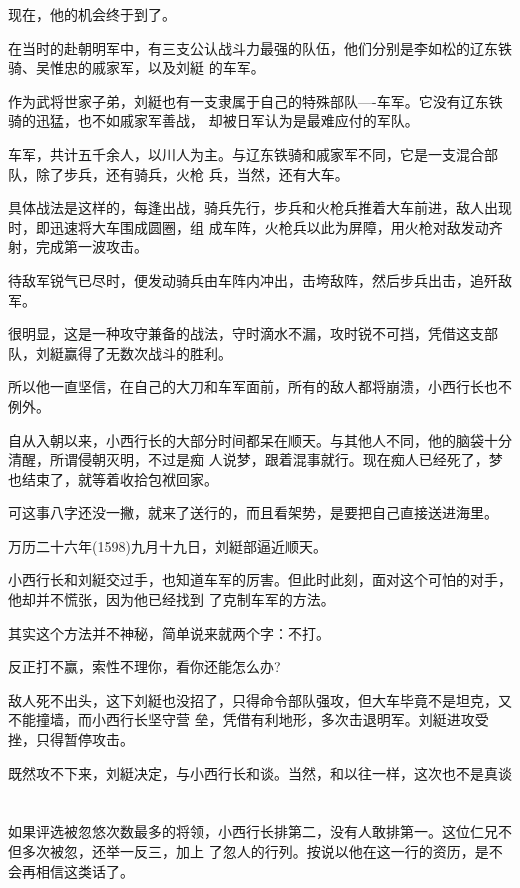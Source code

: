 \documentclass[11pt,a4paper,onecolumn]{article}
\begin{document}
现在，他的机会终于到了。

在当时的赴朝明军中，有三支公认战斗力最强的队伍，他们分别是李如松的辽东铁骑、吴惟忠的戚家军，以及刘綎
的车军。

作为武将世家子弟，刘綎也有一支隶属于自己的特殊部队----车军。它没有辽东铁骑的迅猛，也不如戚家军善战，
却被日军认为是最难应付的军队。

车军，共计五千余人，以川人为主。与辽东铁骑和戚家军不同，它是一支混合部队，除了步兵，还有骑兵，火枪
兵，当然，还有大车。

具体战法是这样的，每逢出战，骑兵先行，步兵和火枪兵推着大车前进，敌人出现时，即迅速将大车围成圆圈，组
成车阵，火枪兵以此为屏障，用火枪对敌发动齐射，完成第一波攻击。

待敌军锐气已尽时，便发动骑兵由车阵内冲出，击垮敌阵，然后步兵出击，追歼敌军。

很明显，这是一种攻守兼备的战法，守时滴水不漏，攻时锐不可挡，凭借这支部队，刘綎赢得了无数次战斗的胜利。

所以他一直坚信，在自己的大刀和车军面前，所有的敌人都将崩溃，小西行长也不例外。

自从入朝以来，小西行长的大部分时间都呆在顺天。与其他人不同，他的脑袋十分清醒，所谓侵朝灭明，不过是痴
人说梦，跟着混事就行。现在痴人已经死了，梦也结束了，就等着收拾包袱回家。

可这事八字还没一撇，就来了送行的，而且看架势，是要把自己直接送进海里。

万历二十六年(1598)九月十九日，刘綎部逼近顺天。

小西行长和刘綎交过手，也知道车军的厉害。但此时此刻，面对这个可怕的对手，他却并不慌张，因为他已经找到
了克制车军的方法。

其实这个方法并不神秘，简单说来就两个字：不打。

反正打不赢，索性不理你，看你还能怎么办?

敌人死不出头，这下刘綎也没招了，只得命令部队强攻，但大车毕竟不是坦克，又不能撞墙，而小西行长坚守营
垒，凭借有利地形，多次击退明军。刘綎进攻受挫，只得暂停攻击。

既然攻不下来，刘綎决定，与小西行长和谈。当然，和以往一样，这次也不是真谈

\section[\thesection]{}

如果评选被忽悠次数最多的将领，小西行长排第二，没有人敢排第一。这位仁兄不但多次被忽，还举一反三，加上
了忽人的行列。按说以他在这一行的资历，是不会再相信这类话了。
\end{document}
